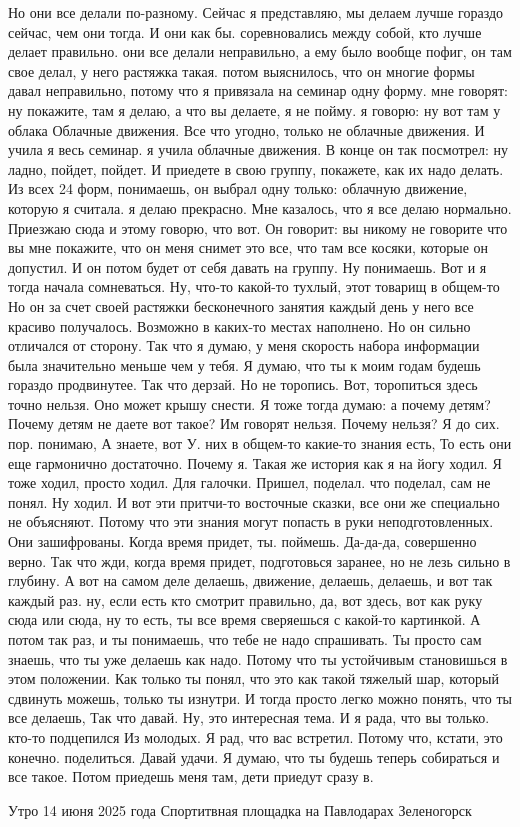 Но они все делали по-разному.
Сейчас я представляю, мы делаем лучше гораздо сейчас, чем они тогда.
И они как бы.
соревновались между собой, кто лучше делает правильно. они все делали неправильно, а ему было вообще пофиг, он там свое делал, у него растяжка такая. потом выяснилось, что он многие формы давал неправильно, потому что я привязала на семинар одну форму.
мне говорят: ну покажите, там я делаю, а что вы делаете, я не пойму. я говорю: ну вот там у облака Облачные движения.
Все что угодно, только не облачные движения.
И учила я весь семинар. я учила облачные движения.
В конце он так посмотрел: ну ладно, пойдет, пойдет.
И приедете в свою группу, покажете, как их надо делать.
Из всех 24 форм, понимаешь, он выбрал одну только: облачную движение, которую я считала. я делаю прекрасно.
Мне казалось, что я все делаю нормально.
Приезжаю сюда и этому говорю, что вот.
Он говорит: вы никому не говорите что вы мне покажите, что он меня снимет это все, что там все косяки, которые он допустил.
И он потом будет от себя давать на группу.
Ну понимаешь.
Вот и я тогда начала сомневаться.
Ну, что-то какой-то тухлый, этот товарищ в общем-то
Но он за счет своей растяжки бесконечного занятия каждый день у него все красиво получалось.
Возможно в каких-то местах наполнено.
Но он сильно отличался от сторону.
Так что я думаю, у меня скорость набора информации была значительно меньше чем у тебя.
Я думаю, что ты к моим годам будешь гораздо продвинутее.
Так что дерзай.
Но не торопись.
Вот, торопиться здесь точно нельзя.
Оно может крышу снести.
Я тоже тогда думаю: а почему детям?
Почему детям не даете вот такое?
Им говорят нельзя.
Почему нельзя?
Я до сих. пор.
понимаю, А знаете, вот У.
них в общем-то какие-то знания есть, То есть они еще гармонично достаточно.
Почему я.
Такая же история как я на йогу ходил.
Я тоже ходил, просто ходил.
Для галочки.
Пришел, поделал. что поделал, сам не понял.
Ну ходил.
И вот эти притчи-то восточные сказки, все они же специально не объясняют.
Потому что эти знания могут попасть в руки неподготовленных.
Они зашифрованы.
Когда время придет, ты.
поймешь.
Да-да-да, совершенно верно.
Так что жди, когда время придет, подготовься заранее, но не лезь сильно в глубину.
А вот на самом деле делаешь, движение, делаешь, делаешь, и вот так каждый раз. ну, если есть кто смотрит правильно, да, вот здесь, вот как руку сюда или сюда, ну то есть, ты все время сверяешься с какой-то картинкой.
А потом так раз, и ты понимаешь, что тебе не надо спрашивать.
Ты просто сам знаешь, что ты уже делаешь как надо.
Потому что ты устойчивым становишься в этом положении.
Как только ты понял, что это как такой тяжелый шар, который сдвинуть можешь, только ты изнутри.
И тогда просто легко можно понять, что ты все делаешь, Так что давай.
Ну, это интересная тема.
И я рада, что вы только.
кто-то подцепился Из молодых. Я рад, что вас встретил.
Потому что, кстати, это конечно.
поделиться. Давай удачи. Я думаю, что ты будешь теперь собираться и все такое. Потом приедешь меня там, дети приедут сразу в.

Утро 14 июня 2025 года
Спортитвная площадка на Павлодарах
Зеленогорск
\bye
